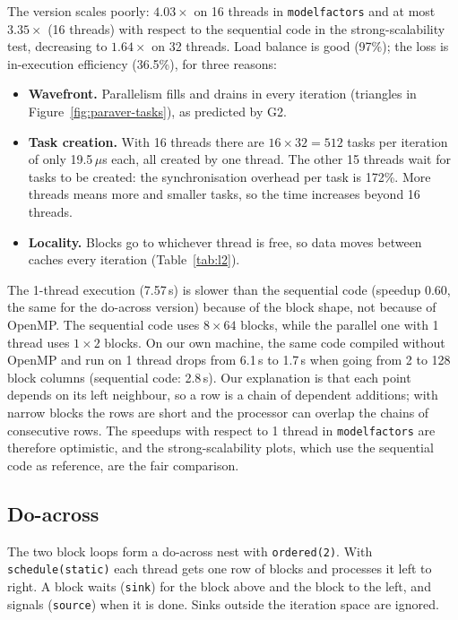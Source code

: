 \documentclass[11pt,a4paper]{article}
\begin{document}
The version scales poorly: $4.03\times$ on 16 threads in \texttt{modelfactors} and at most $3.35\times$ (16 threads) with respect to the sequential code in the strong-scalability test, decreasing to $1.64\times$ on 32 threads. Load balance is good (97\%); the loss is in-execution efficiency (36.5\%), for three reasons:
\begin{itemize}
  \item \textbf{Wavefront.} Parallelism fills and drains in every iteration (triangles in Figure~\ref{fig:paraver-tasks}), as predicted by G2.
  \item \textbf{Task creation.} With 16 threads there are $16\times32=512$ tasks per iteration of only 19.5\,$\mu$s each, all created by one thread. The other 15 threads wait for tasks to be created: the synchronisation overhead per task is 172\%. More threads means more and smaller tasks, so the time increases beyond 16 threads.
  \item \textbf{Locality.} Blocks go to whichever thread is free, so data moves between caches every iteration (Table~\ref{tab:l2}).
\end{itemize}

The 1-thread execution (7.57\,s) is slower than the sequential code (speedup 0.60, the same for the do-across version) because of the block shape, not because of OpenMP. The sequential code uses $8\times64$ blocks, while the parallel one with 1 thread uses $1\times2$ blocks. On our own machine, the same code compiled without OpenMP and run on 1 thread drops from 6.1\,s to 1.7\,s when going from 2 to 128 block columns (sequential code: 2.8\,s). Our explanation is that each point depends on its left neighbour, so a row is a chain of dependent additions; with narrow blocks the rows are short and the processor can overlap the chains of consecutive rows. The speedups with respect to 1 thread in \texttt{modelfactors} are therefore optimistic, and the strong-scalability plots, which use the sequential code as reference, are the fair comparison.

\subsection{Do-across}

The two block loops form a do-across nest with \texttt{ordered(2)}. With \texttt{schedule(static)} each thread gets one row of blocks and processes it left to right. A block waits (\texttt{sink}) for the block above and the block to the left, and signals (\texttt{source}) when it is done. Sinks outside the iteration space are ignored.
\end{document}
